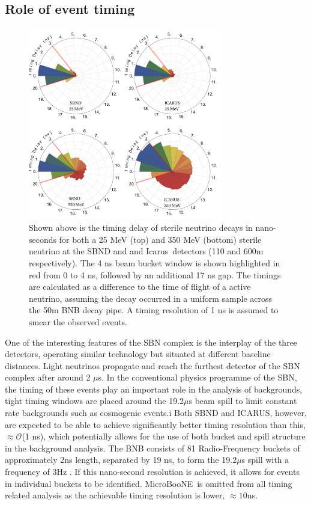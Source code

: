\documentclass[11pt, a4paper]{article}
\def\muboone{MicroBooNE}
\def\icarus{Icarus}
\begin{document}
\subsection{\label{sec:timing}Role of event timing}

\begin{figure}[t]
%
\center
%
\includegraphics[width=0.75\textwidth]{figures/timing.pdf}
%
\caption{\label{fig:timing} Shown above is the timing delay of sterile neutrino
decays in nano-seconds for both a 25 MeV (top) and 350 MeV (bottom) sterile
neutrino at the SBND and and \icarus\ detectors (110 and 600m
respectively). The 4 ns beam bucket window is shown highlighted in red from 0
to 4 ns, followed by an additional 17 ns gap. The timings are calculated as a
difference to the time of flight of a active neutrino, assuming the decay
occurred in a uniform sample across the 50m BNB decay pipe. A timing resolution
of 1 ns is assumed to smear the observed events. }
%
\end{figure}

One of the interesting features of the SBN complex is the interplay of the
three detectors, operating similar technology but situated at different
baseline distances. Light neutrinos propagate and reach the furthest detector
of the SBN complex after around 2 $\mu$s. In the conventional physics programme
of the SBN, the timing of these events play an important role in the analysis
of backgrounds, tight timing windows are placed around the 19.2$\mu$s beam
spill to limit constant rate backgrounds such as cosmogenic events.i Both SBND
and ICARUS, however, are expected to be able to achieve significantly better
timing resolution than this, $\approx \mathcal{O}$(1 ns), which potentially allows for the use of both bucket
and spill structure in the background analysis. The BNB consists of 81
Radio-Frequency buckets of approximately 2ns length, separated by 19 ns, to
form the 19.2$\mu$s spill with a frequency of 3Hz \cite{Antonello:2015lea}.
If this nano-second resolution is achieved, it allows for events in individual buckets to be
identified. \muboone\ is omitted from all timing related analysis as the achievable timing
resolution is lower, $\approx 10$ns.
\end{document}
